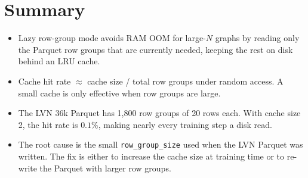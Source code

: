 \documentclass{article}
\begin{document}
\section{Summary}

\begin{itemize}[noitemsep]
  \item Lazy row-group mode avoids RAM OOM for large-$N$ graphs by reading
    only the Parquet row groups that are currently needed, keeping the rest
    on disk behind an LRU cache.
  \item Cache hit rate $\approx$ cache size / total row groups under random
    access.  A small cache is only effective when row groups are large.
  \item The LVN 36k Parquet has 1{,}800 row groups of 20 rows each.  With
    cache size 2, the hit rate is $0.1\%$, making nearly every training step
    a disk read.
  \item The root cause is the small \texttt{row\_group\_size} used when the
    LVN Parquet was written.  The fix is either to increase the cache size
    at training time or to re-write the Parquet with larger row groups.
\end{itemize}
\end{document}
